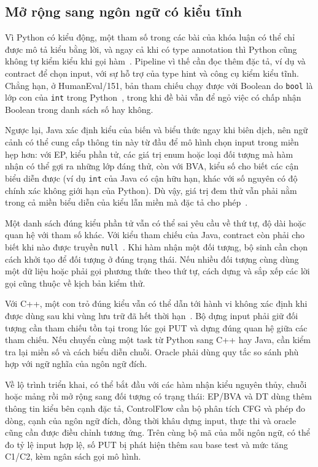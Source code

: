 \subsection*{Mở rộng sang ngôn ngữ có kiểu tĩnh}

Vì Python có kiểu động, một tham số trong các bài của khóa luận có thể chỉ được mô tả kiểu bằng lời, và ngay cả khi có type annotation thì Python cũng không tự kiểm kiểu khi gọi hàm~\cite{pythonTypingDocs}. Pipeline vì thế cần đọc thêm đặc tả, ví dụ và contract để chọn input, với sự hỗ trợ của type hint và công cụ kiểm kiểu tĩnh. Chẳng hạn, ở HumanEval/151, bản tham chiếu chạy được với Boolean do \texttt{bool} là lớp con của \texttt{int} trong Python~\cite{pythonBuiltinTypesDocs}, trong khi đề bài vẫn để ngỏ việc có chấp nhận Boolean trong danh sách số hay không.

Ngược lại, Java xác định kiểu của biến và biểu thức ngay khi biên dịch, nên ngữ cảnh có thể cung cấp thông tin này từ đầu để mô hình chọn input trong miền hẹp hơn: với EP, kiểu phần tử, các giá trị enum hoặc loại đối tượng mà hàm nhận có thể gợi ra những lớp đáng thử, còn với BVA, kiểu số cho biết các cận biểu diễn được (ví dụ \texttt{int} của Java có cận hữu hạn, khác với số nguyên có độ chính xác không giới hạn của Python). Dù vậy, giá trị đem thử vẫn phải nằm trong cả miền biểu diễn của kiểu lẫn miền mà đặc tả cho phép~\cite{javaTypesSpec,pythonBuiltinTypesDocs}.

Một danh sách đúng kiểu phần tử vẫn có thể sai yêu cầu về thứ tự, độ dài hoặc quan hệ với tham số khác. Với kiểu tham chiếu của Java, contract còn phải cho biết khi nào được truyền \texttt{null}~\cite{javaTypesSpec}. Khi hàm nhận một đối tượng, bộ sinh cần chọn cách khởi tạo để đối tượng ở đúng trạng thái. Nếu nhiều đối tượng cùng dùng một dữ liệu hoặc phải gọi phương thức theo thứ tự, cách dựng và sắp xếp các lời gọi cũng thuộc về kịch bản kiểm thử.

Với C++, một con trỏ đúng kiểu vẫn có thể dẫn tới hành vi không xác định khi được dùng sau khi vùng lưu trữ đã hết thời hạn~\cite{cppCompoundTypesSpec}. Bộ dựng input phải giữ đối tượng cần tham chiếu tồn tại trong lúc gọi PUT và dựng đúng quan hệ giữa các tham chiếu. Nếu chuyển cùng một task từ Python sang C++ hay Java, cần kiểm tra lại miền số và cách biểu diễn chuỗi. Oracle phải dùng quy tắc so sánh phù hợp với ngữ nghĩa của ngôn ngữ đích.

Về lộ trình triển khai, có thể bắt đầu với các hàm nhận kiểu nguyên thủy, chuỗi hoặc mảng rồi mở rộng sang đối tượng có trạng thái: EP/BVA và DT dùng thêm thông tin kiểu bên cạnh đặc tả, ControlFlow cần bộ phân tích CFG và phép đo dòng, cạnh của ngôn ngữ đích, đồng thời khâu dựng input, thực thi và oracle cũng cần được điều chỉnh tương ứng. Trên cùng bộ mã của mỗi ngôn ngữ, có thể đo tỷ lệ input hợp lệ, số PUT bị phát hiện thêm sau base test và mức tăng C1/C2, kèm ngân sách gọi mô hình.
